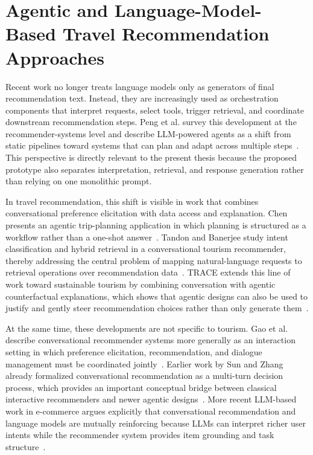 \section{Agentic and Language-Model-Based Travel Recommendation Approaches}\label{section:related-work:agentic-approaches}
Recent work no longer treats language models only as generators of final recommendation text. Instead, they are increasingly used as orchestration components that interpret requests, select tools, trigger retrieval, and coordinate downstream recommendation steps. Peng et al. survey this development at the recommender-systems level and describe LLM-powered agents as a shift from static pipelines toward systems that can plan and adapt across multiple steps~\parencite{pengLLMAgentSurvey}. This perspective is directly relevant to the present thesis because the proposed prototype also separates interpretation, retrieval, and response generation rather than relying on one monolithic prompt.

In travel recommendation, this shift is visible in work that combines conversational preference elicitation with data access and explanation. Chen presents an agentic trip-planning application in which planning is structured as a workflow rather than a one-shot answer~\parencite{chenAgenticTripPlanning}. Tandon and Banerjee study intent classification and hybrid retrieval in a conversational tourism recommender, thereby addressing the central problem of mapping natural-language requests to retrieval operations over recommendation data~\parencite{tandonBanerjeeIntentRetrieval}. TRACE extends this line of work toward sustainable tourism by combining conversation with agentic counterfactual explanations, which shows that agentic designs can also be used to justify and gently steer recommendation choices rather than only generate them~\parencite{banerjeeTrace}.

At the same time, these developments are not specific to tourism. Gao et al. describe conversational recommender systems more generally as an interaction setting in which preference elicitation, recommendation, and dialogue management must be coordinated jointly~\parencite{gaoCRSSurvey}. Earlier work by Sun and Zhang already formalized conversational recommendation as a multi-turn decision process, which provides an important conceptual bridge between classical interactive recommenders and newer agentic designs~\parencite{sunZhangCRS}. More recent LLM-based work in e-commerce argues explicitly that conversational recommendation and language models are mutually reinforcing because LLMs can interpret richer user intents while the recommender system provides item grounding and task structure~\parencite{liuEcommerceLLMCRS}.


